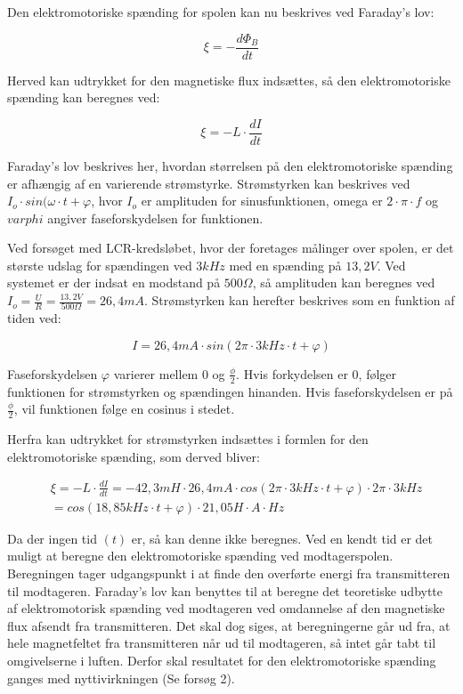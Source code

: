 Den elektromotoriske spænding for spolen kan nu beskrives ved Faraday's lov:

\begin{equation}
\xi = - \frac{d\Phi_B}{dt}
\end{equation}

Herved kan udtrykket for den magnetiske flux indsættes, så den elektromotoriske spænding kan beregnes ved:

\begin{equation}
\xi = - L \cdot \frac{dI}{dt}
\end{equation}

Faraday's lov beskrives her, hvordan størrelsen på den elektromotoriske spænding er afhængig af en varierende strømstyrke. Strømstyrken kan beskrives ved $I_o \cdot sin(\omega \cdot t + \varphi$, hvor $I_o$ er amplituden for sinusfunktionen, omega er $2 \cdot \pi \cdot f$ og $varphi$ angiver faseforskydelsen for funktionen.

Ved forsøget med LCR-kredsløbet, hvor der foretages målinger over spolen, er det største udslag for spændingen ved $3 kHz$ med en spænding på $13,2 V$. Ved systemet er der indsat en modstand på $500 \Omega$, så amplituden kan beregnes ved $I_o = \frac{U}{R} = \frac{13,2 V}{500 \Omega} = 26,4 mA$. Strømstyrken kan herefter beskrives som en funktion af tiden ved:

\begin{equation}
I = 26,4 mA \cdot sin(2 \pi \cdot 3 kHz \cdot t + \varphi)
\end{equation}

Faseforskydelsen $\varphi$ varierer mellem 0 og $\frac{\phi}{2}$. Hvis forkydelsen er 0, følger funktionen for strømstyrken og spændingen hinanden. Hvis faseforskydelsen er på $\frac{\phi}{2}$, vil funktionen følge en cosinus i stedet.

Herfra kan udtrykket for strømstyrken indsættes i formlen for den elektromotoriske spænding, som derved bliver:

\begin{equation}
\begin{aligned}
&\xi = - L \cdot \frac{dI}{dt} = - 42,3 mH \cdot 26,4 mA \cdot cos(2 \pi \cdot 3 kHz \cdot t +\varphi) \cdot 2 \pi \cdot 3 kHz \\
&= cos(18,85 kHz \cdot t + \varphi) \cdot 21,05 H \cdot A \cdot Hz
\end{aligned}
\end{equation}

Da der ingen tid $(t)$ er, så kan denne ikke beregnes. Ved en kendt tid er det muligt at beregne den elektromotoriske spænding ved modtagerspolen. Beregningen tager udgangspunkt i at finde den overførte energi fra transmitteren til modtageren. Faraday's lov kan benyttes til at beregne det teoretiske udbytte af elektromotorisk spænding ved modtageren ved omdannelse af den magnetiske flux afsendt fra transmitteren. Det skal dog siges, at beregningerne går ud fra, at hele magnetfeltet fra transmitteren når ud til modtageren, så intet går tabt til omgivelserne i luften. Derfor skal resultatet for den elektromotoriske spænding ganges med nyttivirkningen (Se forsøg 2).

